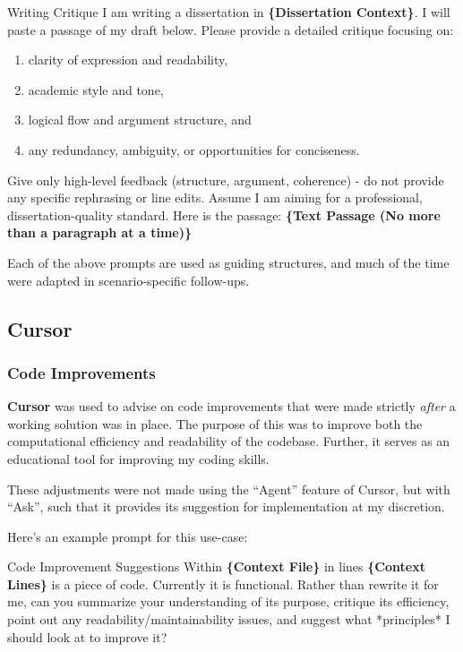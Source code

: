 \begin{appendices}
  \begin{prompt}{Writing Critique}
    I am writing a dissertation in \textbf{\{Dissertation Context\}}.
    I will paste a passage of my draft below.
    Please provide a detailed critique focusing on:
    \begin{enumerate}
      \item clarity of expression and readability,
      \item academic style and tone,
      \item logical flow and argument structure, and
      \item any redundancy, ambiguity, or opportunities for conciseness.
    \end{enumerate}
    Give only high-level feedback (structure, argument, coherence) - do not provide any specific rephrasing or line edits.
    Assume I am aiming for a professional, dissertation-quality standard.
    Here is the passage:
    \textbf{\{Text Passage (No more than a paragraph at a time)\}}
  \end{prompt}

  Each of the above prompts are used as guiding structures, and much of the time were adapted in scenario-specific follow-ups.

  \subsection{Cursor}

  \subsubsection{Code Improvements}

  \textbf{Cursor} was used to advise on code improvements that were made strictly \emph{after} a working solution was in place.
  The purpose of this was to improve both the computational efficiency and readability of the codebase.
  Further, it serves as an educational tool for improving my coding skills.

  These adjustments were not made using the ``Agent'' feature of Cursor, but with ``Ask'', such that it provides its suggestion for implementation at my discretion.

  Here's an example prompt for this use-case:

  \begin{prompt}{Code Improvement Suggestions}
    Within \textbf{\{Context File\}} in lines \textbf{\{Context Lines\}} is a piece of code. Currently it is functional.
    Rather than rewrite it for me, can you summarize your understanding of its purpose, critique its efficiency, point out
    any readability/maintainability issues, and suggest what *principles* I should look at to improve it?
  \end{prompt}


\end{appendices}
